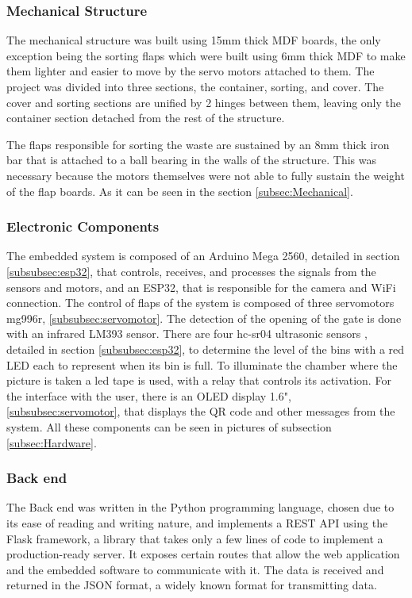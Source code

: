 \documentclass[a4paper,11pt]{article}
\begin{document}
\subsubsection{Mechanical Structure}
The mechanical structure was built using 15mm thick MDF boards, the only exception being the sorting flaps which were built using 6mm thick MDF to make them lighter and easier to move by the servo motors attached to them. The project was divided into three sections, the container, sorting, and cover. The cover and sorting sections are unified by 2 hinges between them, leaving only the container section detached from the rest of the structure.

The flaps responsible for sorting the waste are sustained by an 8mm thick iron bar that is attached to a ball bearing in the walls of the structure. This was necessary because the motors themselves were not able to fully sustain the weight of the flap boards. As it can be seen in the section \ref{subsec:Mechanical}.

\subsubsection{Electronic Components}
The embedded system is composed of an Arduino Mega 2560, detailed in section \ref{subsubsec:esp32}, that controls, receives, and processes the signals from the sensors and motors, and an ESP32, that is responsible for the camera and WiFi connection.
The control of flaps of the system is composed of three servomotors mg996r, \ref{subsubsec:servomotor}. The detection of the opening of the gate is done with an infrared LM393 sensor. There are four hc-sr04 ultrasonic sensors , detailed in section \ref{subsubsec:esp32}, to determine the level of the bins with a red LED each to represent when its bin is full. To illuminate the chamber where the picture is taken a led tape is used, with a relay that controls its activation. For the interface with the user, there is an OLED display 1.6", \ref{subsubsec:servomotor}, that displays the QR code and other messages from the system. All these components can be seen in pictures of subsection \ref{subsec:Hardware}.

\subsubsection{Back end}
The Back end was written in the Python\cite{python}  programming language, chosen due to its ease of reading and writing nature, and implements a REST API using the Flask\cite{flask} framework, a library that takes only a few lines of code to implement a production-ready server. It exposes certain routes that allow the web application and the embedded software to communicate with it. The data is received and returned in the JSON format, a widely known format for transmitting data.
\end{document}
